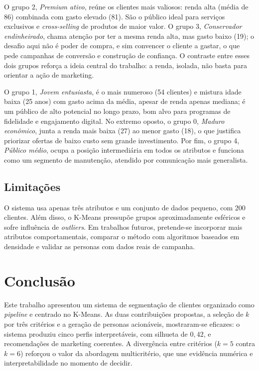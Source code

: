 \documentclass[conference]{IEEEtran}
\begin{document}
O grupo 2, \textit{Premium ativo}, re\'une os clientes mais valiosos: renda alta (m\'edia de 86) combinada com gasto elevado (81). S\~ao o p\'ublico ideal para servi\c{c}os exclusivos e \textit{cross-selling} de produtos de maior valor. O grupo 3, \textit{Conservador endinheirado}, chama aten\c{c}\~ao por ter a mesma renda alta, mas gasto baixo (19); o desafio aqui n\~ao \'e poder de compra, e sim convencer o cliente a gastar, o que pede campanhas de convers\~ao e constru\c{c}\~ao de confian\c{c}a. O contraste entre esses dois grupos refor\c{c}a a ideia central do trabalho: a renda, isolada, n\~ao basta para orientar a a\c{c}\~ao de marketing.

O grupo 1, \textit{Jovem entusiasta}, \'e o mais numeroso (54 clientes) e mistura idade baixa (25 anos) com gasto acima da m\'edia, apesar de renda apenas mediana; \'e um p\'ublico de alto potencial no longo prazo, bom alvo para programas de fidelidade e engajamento digital. No extremo oposto, o grupo 0, \textit{Maduro econ\^omico}, junta a renda mais baixa (27) ao menor gasto (18), o que justifica priorizar ofertas de baixo custo sem grande investimento. Por fim, o grupo 4, \textit{P\'ublico m\'edio}, ocupa a posi\c{c}\~ao intermedi\'aria em todos os atributos e funciona como um segmento de manuten\c{c}\~ao, atendido por comunica\c{c}\~ao mais generalista.

\subsection{Limita\c{c}\~oes}
O sistema usa apenas tr\^es atributos e um conjunto de dados pequeno, com 200 clientes. Al\'em disso, o K-Means pressup\~oe grupos aproximadamente esf\'ericos e sofre influ\^encia de \textit{outliers}. Em trabalhos futuros, pretende-se incorporar mais atributos comportamentais, comparar o m\'etodo com algoritmos baseados em densidade e validar as personas com dados reais de campanha.

\section{Conclus\~ao}
Este trabalho apresentou um sistema de segmenta\c{c}\~ao de clientes organizado como \textit{pipeline} e centrado no K-Means. As duas contribui\c{c}\~oes propostas, a sele\c{c}\~ao de $k$ por tr\^es crit\'erios e a gera\c{c}\~ao de personas acion\'aveis, mostraram-se eficazes: o sistema produziu cinco perfis interpret\'aveis, com silhueta de $0{,}42$, e recomenda\c{c}\~oes de marketing coerentes. A diverg\^encia entre crit\'erios ($k=5$ contra $k=6$) refor\c{c}ou o valor da abordagem multicrit\'erio, que une evid\^encia num\'erica e interpretabilidade no momento de decidir.
\end{document}
